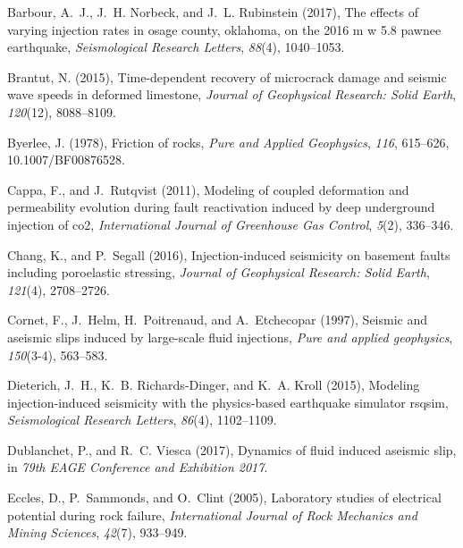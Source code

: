 \documentclass[grl]{agutex2arxiv}
\begin{document}
\begin{article}
\begin{thebibliography}{44}
Barbour, A.~J., J.~H. Norbeck, and J.~L. Rubinstein (2017), The effects of
  varying injection rates in osage county, oklahoma, on the 2016 m w 5.8 pawnee
  earthquake, \textit{Seismological Research Letters}, \textit{88}(4),
  1040--1053.

Brantut, N. (2015), Time-dependent recovery of microcrack damage and seismic
  wave speeds in deformed limestone, \textit{Journal of Geophysical Research:
  Solid Earth}, \textit{120}(12), 8088--8109.

Byerlee, J. (1978), Friction of rocks, \textit{Pure and Applied Geophysics},
  \textit{116}, 615--626, 10.1007/BF00876528.

Cappa, F., and J.~Rutqvist (2011), Modeling of coupled deformation and
  permeability evolution during fault reactivation induced by deep underground
  injection of co2, \textit{International Journal of Greenhouse Gas Control},
  \textit{5}(2), 336--346.

Chang, K., and P.~Segall (2016), Injection-induced seismicity on basement
  faults including poroelastic stressing, \textit{Journal of Geophysical
  Research: Solid Earth}, \textit{121}(4), 2708--2726.

Cornet, F., J.~Helm, H.~Poitrenaud, and A.~Etchecopar (1997), Seismic and
  aseismic slips induced by large-scale fluid injections, \textit{Pure and
  applied geophysics}, \textit{150}(3-4), 563--583.

Dieterich, J.~H., K.~B. Richards-Dinger, and K.~A. Kroll (2015), Modeling
  injection-induced seismicity with the physics-based earthquake simulator
  rsqsim, \textit{Seismological Research Letters}, \textit{86}(4), 1102--1109.

Dublanchet, P., and R.~C. Viesca (2017), Dynamics of fluid induced aseismic
  slip, in \textit{79th EAGE Conference and Exhibition 2017}.

Eccles, D., P.~Sammonds, and O.~Clint (2005), Laboratory studies of electrical
  potential during rock failure, \textit{International Journal of Rock
  Mechanics and Mining Sciences}, \textit{42}(7), 933--949.


\end{thebibliography}
\end{article}
\end{document}
